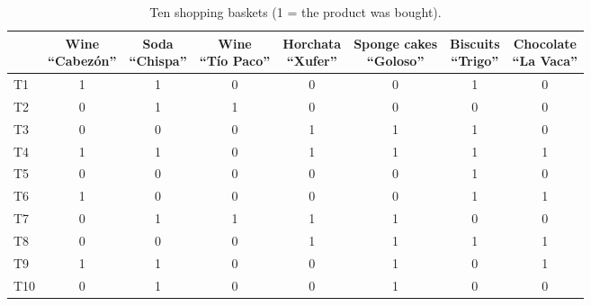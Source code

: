\begin{table}[htbp]
\centering\small
\caption{Ten shopping baskets (1 = the product was bought).}\label{tab:baskets}
\setlength{\tabcolsep}{4.5pt}
\begin{tabular}{@{}lccccccc@{}}
\toprule
& \makecell{Wine\\``Cabez\'on''} & \makecell{Soda\\``Chispa''} & \makecell{Wine\\``T\'io Paco''}
& \makecell{Horchata\\``Xufer''} & \makecell{Sponge cakes\\``Goloso''} & \makecell{Biscuits\\``Trigo''}
& \makecell{Chocolate\\``La Vaca''}\\
\midrule
T1  & 1 & 1 & 0 & 0 & 0 & 1 & 0\\
T2  & 0 & 1 & 1 & 0 & 0 & 0 & 0\\
T3  & 0 & 0 & 0 & 1 & 1 & 1 & 0\\
T4  & 1 & 1 & 0 & 1 & 1 & 1 & 1\\
T5  & 0 & 0 & 0 & 0 & 0 & 1 & 0\\
T6  & 1 & 0 & 0 & 0 & 0 & 1 & 1\\
T7  & 0 & 1 & 1 & 1 & 1 & 0 & 0\\
T8  & 0 & 0 & 0 & 1 & 1 & 1 & 1\\
T9  & 1 & 1 & 0 & 0 & 1 & 0 & 1\\
T10 & 0 & 1 & 0 & 0 & 1 & 0 & 0\\
\bottomrule
\end{tabular}
\end{table}

